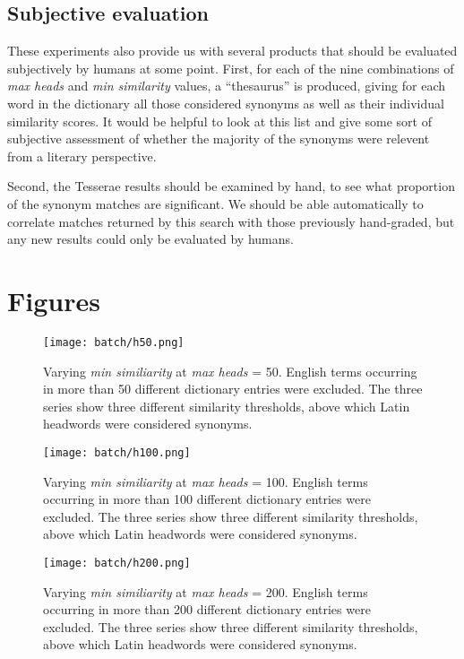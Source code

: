 \documentclass[]{article}
\begin{document}
	\subsection{Subjective evaluation}
	
	These experiments also provide us with several products that should be evaluated subjectively by humans at some point.  First, for each of the nine combinations of \emph{max heads} and \emph{min similarity} values, a “thesaurus” is produced, giving for each word in the dictionary all those considered synonyms as well as their individual similarity scores.  It would be helpful to look at this list and give some sort of subjective assessment of whether the majority of the synonyms were relevent from a literary perspective.
	
	Second, the Tesserae results should be examined by hand, to see what proportion of the synonym matches are significant.  We should be able automatically to correlate matches returned by this search with those previously hand-graded, but any new results could only be evaluated by humans.
	
	\clearpage
	
	\section{Figures}
	
	\begin{figure}[h]
		\texttt{[image: batch/h50.png]}
		\caption{Varying \emph{min similiarity} at \emph{max heads} = 50.  English terms occurring in more than 50 different dictionary entries were excluded.  The three series show three different similarity thresholds, above which Latin headwords were considered synonyms.\label{h50}}
	\end{figure}

	\begin{figure}
		\texttt{[image: batch/h100.png]}
		\caption{Varying \emph{min similiarity} at \emph{max heads} = 100.  English terms occurring in more than 100 different dictionary entries were excluded.  The three series show three different similarity thresholds, above which Latin headwords were considered synonyms.\label{h100}}
	\end{figure}

	\begin{figure}
		\texttt{[image: batch/h200.png]}
		\caption{Varying \emph{min similiarity} at \emph{max heads} = 200.  English terms occurring in more than 200 different dictionary entries were excluded.  The three series show three different similarity thresholds, above which Latin headwords were considered synonyms.\label{h200}}
	\end{figure}
\end{document}

